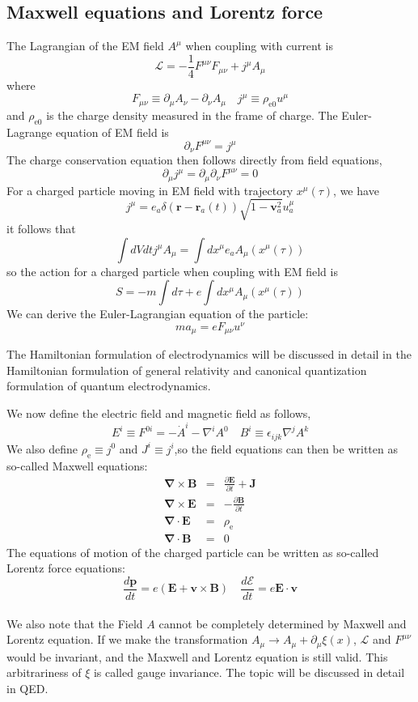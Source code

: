 \subsection{Maxwell equations and Lorentz force}
The Lagrangian of the EM field $A^{\mu}$ when coupling with current is
\[\mathcal{L} = -\frac{1}{4}F^{\mu\nu}F_{\mu\nu} + j^{\mu} A_{\mu}\]
where
\[F_{\mu\nu} \equiv \partial_{\mu}A_{\nu} - \partial_{\nu}A_{\mu} \quad j^{\mu} \equiv \rho_{\mathrm{e}0} u^{\mu}\]
and $\rho_{\mathrm{e}0}$ is the charge density measured in the frame of charge.
The Euler-Lagrange equation of EM field is
\[\partial_{\nu} F^{\mu\nu} = j^{\mu}\]
The charge conservation equation then follows directly from field equations,
\[\partial_{\mu} j^{\mu} = \partial_{\mu} \partial_{\nu} F^{\mu\nu} = 0\]
For a charged particle moving in EM field with trajectory $x^{\mu}(\tau)$, we have
\[j^{\mu} =  e_a \delta(\bm{r}-\bm{r}_a(t)) \sqrt{1-\bm{v}_a^2} u_a^\mu \]
it follows that
\[\int dV dt j^{\mu} A_{\mu} = \int dx^{\mu} e_a A_{\mu}(x^{\mu}(\tau))\]
so the action for a charged particle when coupling with EM field is
\[S = - m \int d\tau + e\int dx^{\mu} A_{\mu}(x^{\mu}(\tau))\]
We can derive the Euler-Lagrangian equation of the particle:
\[ma_{\mu} = eF_{\mu \nu}u^{\nu}\]
\begin{note}
The Hamiltonian formulation of electrodynamics will be discussed in detail in the Hamiltonian formulation of general relativity and canonical quantization formulation of quantum electrodynamics.
\end{note}
\noindent
We now define the electric field and magnetic field as follows,
\[E^i \equiv F^{0i} = -\dot{A}^i - \nabla^i A^0 \quad B^i \equiv \epsilon_{ijk} \nabla^j A^k\]
We also define $\rho_{\mathrm{e}} \equiv j^0$ and $J^i \equiv j^i$,so
the field equations can then be written as so-called Maxwell equations:
\begin{eqnarray}
	\bm{\nabla} \times  \bm{B} &=& \frac{\partial \bm{E}}{\partial t} +  \bm{J} \nonumber \\
	\bm{\nabla} \times \bm{E} &=& -\frac{\partial \bm{B}}{\partial t} \nonumber \\
	\bm{\nabla} \cdot \bm{E} &=& \rho_{\mathrm{e}} \nonumber \\
	\bm{\nabla} \cdot \bm{B} &=& 0 \nonumber
\end{eqnarray}
The equations of motion of the charged particle can be written as so-called Lorentz force equations:
\[\frac{d\bm{p}}{dt} = e(\bm{E} + \bm{v} \times \bm{B}) \quad \frac{d \mathcal{E}}{dt} = e \bm{E} \cdot \bm{v}\]
\\
We also note that the Field $A$ cannot be completely determined by Maxwell and Lorentz equation. If we make the transformation $A_{\mu} \to A_{\mu} + \partial_{\mu} \xi(x)$, $\mathcal{L}$ and $F^{\mu\nu}$ would be invariant, and the Maxwell and Lorentz equation is still valid. This arbitrariness of $\xi$ is called gauge invariance. The topic will be discussed in detail in QED.

